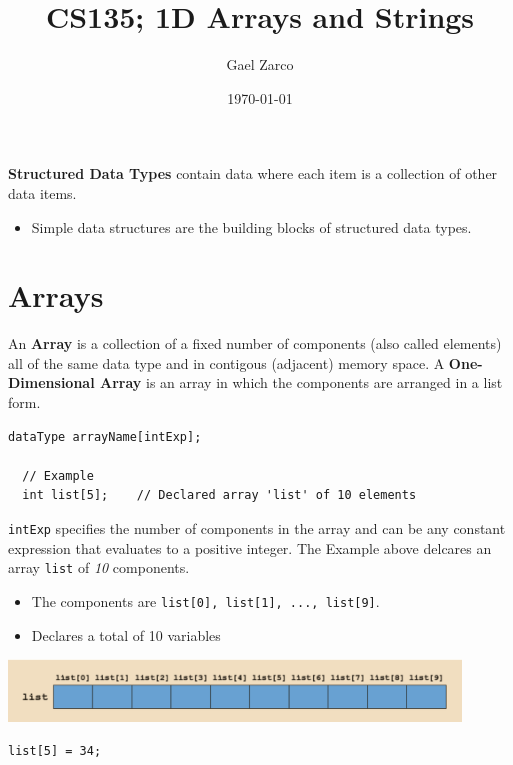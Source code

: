 \documentclass{article}
\title{CS135; 1D Arrays and Strings}
\author{Gael Zarco}
\date{\today}
\begin{document}
\maketitle

\textbf{Structured Data Types} contain data where each item is a collection of
other data items.
\begin{itemize}
  \item Simple data structures are the building blocks of structured data types.
\end{itemize}

\section{Arrays}
An \textbf{Array} is a collection of a fixed number of components (also called
elements) all of the same data type and in contigous (adjacent) memory space. A
\textbf{One-Dimensional Array} is an array in which the components are arranged
in a list form.

\begin{lstlisting}[caption={1D Array Syntax}]
  dataType arrayName[intExp];

  // Example
  int list[5];    // Declared array 'list' of 10 elements
\end{lstlisting}

\texttt{intExp} specifies the number of components in the array and can be any
constant expression that evaluates to a positive integer. The Example above
delcares an array \texttt{list} of \textit{10} components.

\begin{itemize}
  \item The components are \texttt{list[0], list[1], ..., list[9]}.
  \item Declares a total of 10 variables
\end{itemize}

\begin{center}
    \includegraphics[width=0.9\textwidth]{1d-arr-vars.png}
\end{center}

\begin{lstlisting}[caption={1D Array Assignment}]
  list[5] = 34;
\end{lstlisting}
\end{document}
